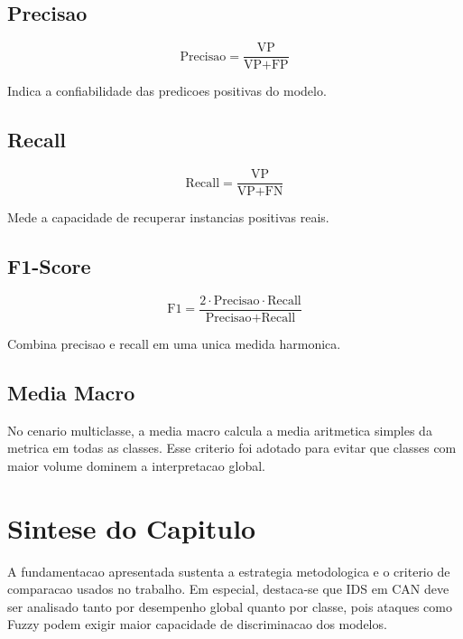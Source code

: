 \subsection{Precisao}

\begin{equation}
\text{Precisao} = \frac{\text{VP}}{\text{VP} + \text{FP}}
\end{equation}

Indica a confiabilidade das predicoes positivas do modelo.

\subsection{Recall}

\begin{equation}
\text{Recall} = \frac{\text{VP}}{\text{VP} + \text{FN}}
\end{equation}

Mede a capacidade de recuperar instancias positivas reais.

\subsection{F1-Score}

\begin{equation}
\text{F1} = \frac{2 \cdot \text{Precisao} \cdot \text{Recall}}{\text{Precisao} + \text{Recall}}
\end{equation}

Combina precisao e recall em uma unica medida harmonica.

\subsection{Media Macro}

No cenario multiclasse, a media macro calcula a media aritmetica simples da metrica em todas as classes. Esse criterio foi adotado para evitar que classes com maior volume dominem a interpretacao global.

\section{Sintese do Capitulo}

A fundamentacao apresentada sustenta a estrategia metodologica e o criterio de comparacao usados no trabalho. Em especial, destaca-se que IDS em CAN deve ser analisado tanto por desempenho global quanto por classe, pois ataques como Fuzzy podem exigir maior capacidade de discriminacao dos modelos.